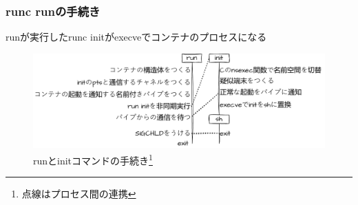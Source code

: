 \documentclass[unicode, 14pt, aspectratio=169]{beamer}
\begin{document}
\begin{frame}
  \frametitle{runc runの手続き}
  runが実行したrunc initがexecveでコンテナのプロセスになる
  \begin{figure}
    \centering
    \includegraphics[width=13cm]{images/overview.drawio.pdf}
    \caption{runとinitコマンドの手続き\footnote{点線はプロセス間の連携}}
    \label{fig:fuga}
  \end{figure}
\end{frame}
\end{document}
